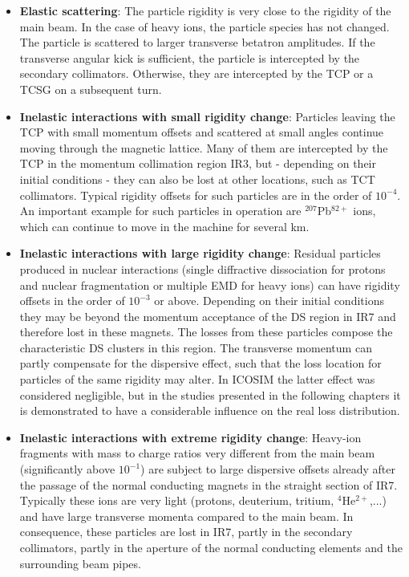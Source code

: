 \begin{itemize}
%
   \item \textbf{Elastic scattering}: The particle rigidity is very close to the rigidity of the main beam. In the case of heavy ions, the particle species has not changed. The particle is scattered to larger transverse betatron amplitudes. If the transverse angular kick is sufficient, the particle is intercepted by the secondary collimators. Otherwise, they are intercepted by the TCP or a TCSG on a subsequent turn.
%
   \item \textbf{Inelastic interactions with small rigidity change}: Particles leaving the TCP with small momentum offsets and scattered at small angles continue moving through the magnetic lattice. Many of them are intercepted by the TCP in the momentum collimation region IR3, but - depending on their initial conditions - they can also be lost at other locations, such as TCT collimators. Typical rigidity offsets for such particles are in the order of $10^{-4}$. An important example for such particles in \lead operation are $^{207}$Pb$^{82+}$ ions, which can continue to move in the machine for several km. 
%
   \item \textbf{Inelastic interactions with large rigidity change}: Residual particles produced in nuclear interactions (single diffractive dissociation for protons and nuclear fragmentation or multiple EMD for heavy ions) can have rigidity offsets in the order of $10^{-3}$ or above. Depending on their initial conditions they may be beyond the momentum acceptance of the DS region in IR7 and therefore lost in these magnets. The losses from these particles compose the characteristic DS clusters in this region. The transverse momentum can partly compensate for the dispersive effect, such that the loss location for particles of the same rigidity may alter. In ICOSIM the latter effect was considered negligible, but in the studies presented in the following chapters it is demonstrated to have a considerable influence on the real loss distribution.
%
   \item \textbf{Inelastic interactions with extreme rigidity change}:
Heavy-ion fragments with mass to charge ratios very different from the main beam (significantly above $10^{-1}$) are subject to large dispersive offsets already after the passage of the normal conducting magnets in the straight section of IR7. Typically these ions are very light (protons, deuterium, tritium, $^{4}$He$^{2+}$,...) and have large transverse momenta compared to the main beam. In consequence, these particles are lost in IR7, partly in the secondary collimators, partly in the aperture of the normal conducting elements and the surrounding beam pipes. 
%
\end{itemize}


